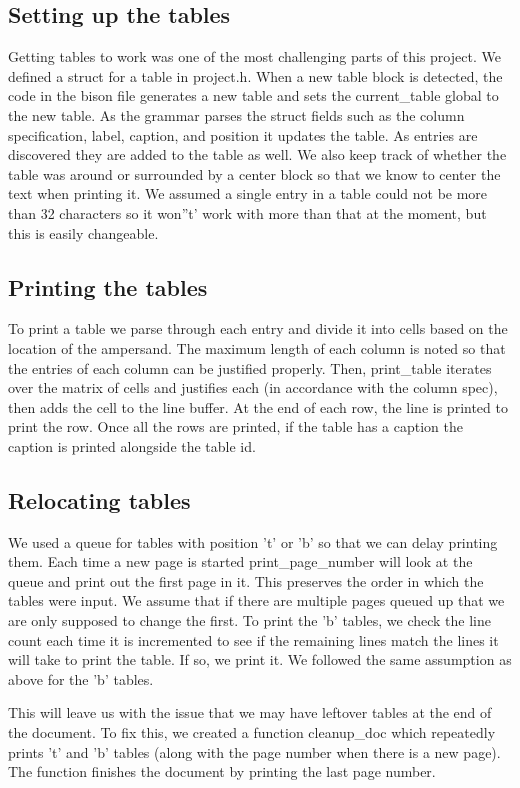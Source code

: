 \subsection{Setting up the tables}
Getting tables to work was one of the most challenging parts of this project. We defined a
struct for a table in project.h. When a new table block is detected, the code in the bison
file generates a new table and sets the current_table global to the new table. As the
grammar parses the struct fields such as the column specification, label, caption, and 
position it updates the table. As entries are discovered they are added to the table as
well. We also keep track of whether the table was around or surrounded by a center block 
so that we know to center the text when printing it. We assumed a single entry in a table 
could not be more than 32 characters so it won''t' work with more than that at the moment,
but this is easily changeable.

\subsection{Printing the tables}
To print a table we parse through each entry and divide it into cells based on the location
of the ampersand. The maximum length of each column is noted so that the entries of each 
column can be justified properly. Then, print_table iterates over the matrix of cells and
justifies each (in accordance with the column spec), then adds the cell to the line buffer.
At the end of each row, the line is printed to print the row. Once all the rows are 
printed, if the table has a caption the caption is printed alongside the table id.

\subsection{Relocating tables}
We used a queue for tables with position 't' or 'b' so that we can delay printing
them. Each time a new page is started print_page_number will look at the queue and print
out the first page in it. This preserves the order in which the tables were input. We
assume that if there are multiple pages queued up that we are only supposed to change the
first. To print the 'b' tables, we check the line count each time it is incremented to see
if the remaining lines match the lines it will take to print the table. If so, we print it.
We followed the same assumption as above for the 'b' tables.

This will leave us with the issue that we may have leftover tables at the end of the
document. To fix this, we created a function cleanup_doc which repeatedly prints 't' and 'b'
tables (along with the page number when there is a new page). The function finishes the 
document by printing the last page number.


